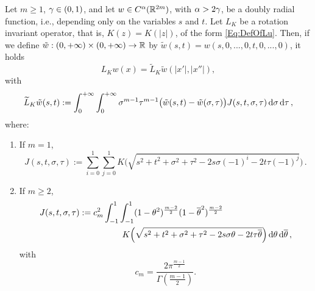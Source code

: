 \begin{lemma}
\label{Lemma:OperatorInSTVariables} Let $m \geq 1$, $\gamma\in(0,1)$, and let $w\in
C^\alpha(\mathbb{R}^{2m})$, with $\alpha > 2\gamma$, be a doubly radial function, i.e., depending only on the variables $s$ and $t$. Let $L_K$ be a rotation invariant operator, that is, $K(z) = K(|z|)$, of the form \eqref{Eq:DefOfLu}. Then, if we define $\tilde{w}:(0,+\infty)\times (0,+\infty) \to \mathbb{R}$ by $\tilde{w}(s,t) = w(s,0,...,0,t,0,...,0)$, it holds
$$ L_Kw(x) = \tilde{L}_K \tilde{w} (|x'|,|x''|), $$
with
\begin{equation*}
\label{Eq:OperatorInSTVariables}
\widetilde{L}_K \tilde{w} (s,t) := \int_0^{+\infty}  \int_0^{+\infty} \sigma^{m-1} \tau^{m-1} \big(\tilde{w}(s,t) - \tilde{w}(\sigma, \tau)\big) J(s,t,\sigma, \tau)  \,\mathrm{d} \sigma\,\mathrm{d} \tau\,,
\end{equation*}
where:
\begin{enumerate}
	\item If $m= 1$,
	\begin{equation}
		\label{Eq:KernelSTVariables1}
	J(s,t,\sigma, \tau) := \sum_{i=0}^1  \sum_{j =0}^1  K\Big(\sqrt{s^2 + t^2 + \sigma^2 + \tau^2 -2 s \sigma (-1)^i -2 t \tau (-1)^j}\Big)\,.
	\end{equation}
	
	\item If $m\geq 2$,
	\begin{align}
	J(s,t,\sigma, \tau) &:= c_m ^2  \int_{-1}^1  \int_{-1}^1  (1-\theta^2)^{\frac{m-2}{2}} (1-\overline{\theta}^2)^{\frac{m-2}{2}} \nonumber\\
	& \quad \quad \quad \quad \quad
	K\Big(\sqrt{s^2 + t^2 + \sigma^2 + \tau^2 -2 s \sigma \theta -2 t \tau \overline{\theta}}\Big) \,\mathrm{d} \theta \,\mathrm{d} \overline{\theta}\,, \label{Eq:KernelSTVariables2}
	\end{align}
	with
	$$
	c_m = \dfrac{2 \pi^{\frac{m-1}{2}}}{\Gamma (\frac{m-1}{2})}.
	$$
\end{enumerate}
\end{lemma}


